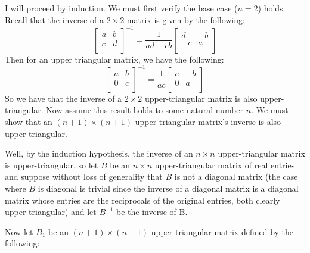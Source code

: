 \documentclass{article}
\begin{document}
I will proceed by induction. We must first verify the base case ($n = 2$) holds. Recall that the inverse of a $2 \times 2$ matrix is given by the following:
\[
\begin{bmatrix}
    a & b\\
    c & d\\

\end{bmatrix}^{-1}
 = 
 \frac{1}{ad - cb}
 \begin{bmatrix}
    d & -b\\
    -c & a\\
 \end{bmatrix}
\]
Then for an upper triangular matrix, we have the following:
\[
\begin{bmatrix}
    a & b\\
    0 & c\\
\end{bmatrix}^{-1}
 = 
 \frac{1}{ac}
 \begin{bmatrix}
    c & -b\\
    0 & a\\
 \end{bmatrix}
\]
So we have that the inverse of a $2 \times 2$ upper-triangular matrix is also upper-triangular. Now assume this result holds to some natural number $n$. We must show that an $(n+1) \times (n+1)$ upper-triangular matrix's inverse is also upper-triangular. 
\newline

Well, by the induction hypothesis, the inverse of an $n \times n$ upper-triangular matrix is upper-triangular, so let $B$ be an $n \times n$ upper-triangular matrix of real entries and suppose without loss of generality that $B$ is not a diagonal matrix (the case where $B$ is diagonal is trivial since the inverse of a diagonal matrix is a diagonal matrix whose entries are the reciprocals of the original entries, both clearly upper-triangular) and let $B^{-1}$ be the inverse of B. 
\newline

Now let $B_1$ be an $(n+1) \times (n+1)$ upper-triangular matrix defined by the following:
\end{document}

